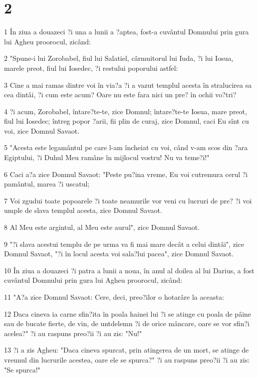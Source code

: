 \chapter{2}

\par 1 În ziua a douazeci ?i una a lunii a ?aptea, fost-a cuvântul Domnului prin gura lui Agheu proorocul, zicând:
\par 2 "Spune-i lui Zorobabel, fiul lui Salatiel, cârmuitorul lui Iuda, ?i lui Iosua, marele preot, fiul lui Iosedec, ?i restului poporului astfel:
\par 3 Cine a mai ramas dintre voi în via?a ?i a vazut templul acesta în stralucirea sa cea dintâi, ?i cum este acum? Oare nu este fara nici un pre? în ochii vo?tri?
\par 4 ?i acum, Zorobabel, întare?te-te, zice Domnul; întare?te-te Iosua, mare preot, fiul lui Iosedec; întreg popor ?arii, fii plin de curaj, zice Domnul, caci Eu sînt cu voi, zice Domnul Savaot.
\par 5 "Acesta este legamântul pe care l-am încheiat cu voi, când v-am scos din ?ara Egiptului, ?i Duhul Meu ramâne în mijlocul vostru! Nu va teme?i!"
\par 6 Caci a?a zice Domnul Savaot: "Peste pu?ina vreme, Eu voi cutremura cerul ?i pamântul, marea ?i uscatul;
\par 7 Voi zgudui toate popoarele ?i toate neamurile vor veni cu lucruri de pre? ?i voi umple de slava templul acesta, zice Domnul Savaot.
\par 8 Al Meu este argintul, al Meu este aurul", zice Domnul Savaot.
\par 9 "?i slava acestui templu de pe urma va fi mai mare decât a celui dintâi", zice Domnul Savaot, "?i în locul acesta voi sala?lui pacea", zice Domnul Savaot.
\par 10 În ziua a douazeci ?i patra a lunii a noua, în anul al doilea al lui Darius, a fost cuvântul Domnului prin gura lui Agheu proorocul, zicând:
\par 11 "A?a zice Domnul Savaot: Cere, deci, preo?ilor o hotarâre la aceasta:
\par 12 Daca cineva ia carne sfin?ita în poala hainei lui ?i se atinge cu poala de pâine sau de bucate fierte, de vin, de untdelemn ?i de orice mâncare, oare se vor sfin?i acelea?" ?i au raspuns preo?ii ?i au zis: "Nu!"
\par 13 ?i a zis Agheu: "Daca cineva spurcat, prin atingerea de un mort, se atinge de vreunul din lucrurile acestea, oare ele se spurca?" ?i au raspuns preo?ii ?i au zis: "Se spurca!"
